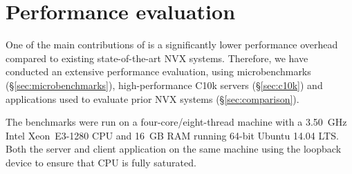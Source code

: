 \section{Performance evaluation}
\label{sec:evaluation}

One of the main contributions of \varan is a significantly lower
performance overhead compared to existing state-of-the-art NVX
systems.  Therefore, we have conducted an extensive performance
evaluation, using microbenchmarks (\S\ref{sec:microbenchmarks}),
high-performance C10k servers (\S\ref{sec:c10k}) and applications used to
evaluate prior NVX systems (\S\ref{sec:comparison}).

The benchmarks were run on a four-core/eight-thread machine with
a 3.50~GHz Intel Xeon~E3-1280 CPU and 16~GB RAM running 64-bit Ubuntu 14.04
LTS. Both the server and client application on the same machine using the
loopback device to ensure that CPU is fully saturated.




